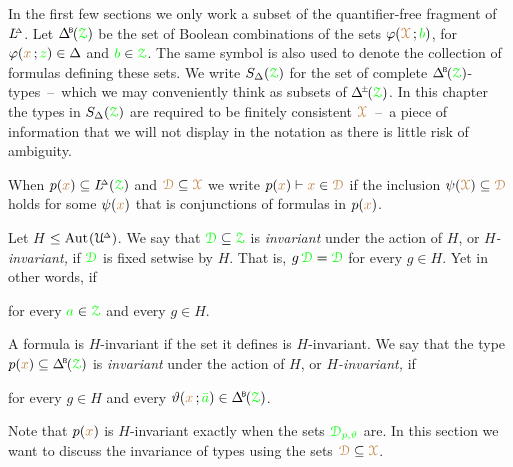 In the first few sections we only work a subset of the quantifier-free fragment of $L\kern-.5ex^{\scriptscriptstyle\Delta}$.
Let $\BDelta(\grZ)$ be the set of Boolean combinations of the sets $\varphi({\color{brown}\EuScript X}\,;{\color{green} b})$, for $\varphi({\color{brown} x}\,;{\color{green} z})\in\Delta$ and ${\color{green} b}\in{\color{green}\EuScript Z}$.
The same symbol is also used to denote the collection of formulas defining these sets.
We write $S_\Delta({\color{green}\EuScript Z})$ for the set of complete $\BDelta(\grZ)$-types~--~which we may conveniently think as subsets of $\pmDelta(\grZ)$.
In this chapter the types in $S_\Delta({\color{green}\EuScript Z})$ are required to be finitely consistent ${\color{brown}\EuScript X}$~--~a piece of information that we will not display in the notation as there is little risk of ambiguity.


When $p({\color{brown} x})\subseteq L\kern-.5ex^{\scriptscriptstyle\Delta}({\color{green}\EuScript Z})$ and ${{\color{brown}\EuScript D}}\subseteq{\color{brown}\EuScript X}$ we write $p({\color{brown} x})\vdash{\color{brown}x}\in{{\color{brown}\EuScript D}}$ if the inclusion $\psi({\color{brown}\EuScript X})\subseteq{{\color{brown}\EuScript D}}$ holds for some $\psi({\color{brown} x})$ that is conjunctions of formulas in $p({\color{brown} x})$.

Let \emph{$H$\/} $\le{\rm Aut\kern.15ex}(\EuScript U\kern-.2ex^{\scriptscriptstyle\Delta})$.
We say that ${\color{green}\EuScript D}\subseteq{\color{green}\EuScript Z}$ is \emph{invariant\/} under the action of $H$, or \emph{$H$-invariant,} if  ${\color{green}\EuScript D}$ is fixed setwise by $H$.
That is, $g\,{\color{green}\EuScript D}={\color{green}\EuScript D}$ for every $g\in H$.
Yet in other words, if

\hfill for every ${\color{green} a}\in{\color{green}\EuScript Z}$ and every $g\in H$.

A formula is $H$-invariant if the set it defines is $H$-invariant.
We say that the type $p({\mr x})\subseteq\BDelta(\grZ)$ is \emph{invariant\/} under the action of $H$, or \emph{$H$-invariant,} if 

\hfill for every $g\in H$ and every $\theta({\mr x}\,;{\gr\bar a})\in\BDelta(\grZ)$.

Note that $p({\color{brown} x})$ is $H$-invariant exactly when the sets ${\color{green}\EuScript D_{p,\vartheta}}$ are.
In this section we want to discuss the invariance of types using the sets ${\color{brown}\EuScript D}\subseteq{\color{brown}\EuScript X}$.

